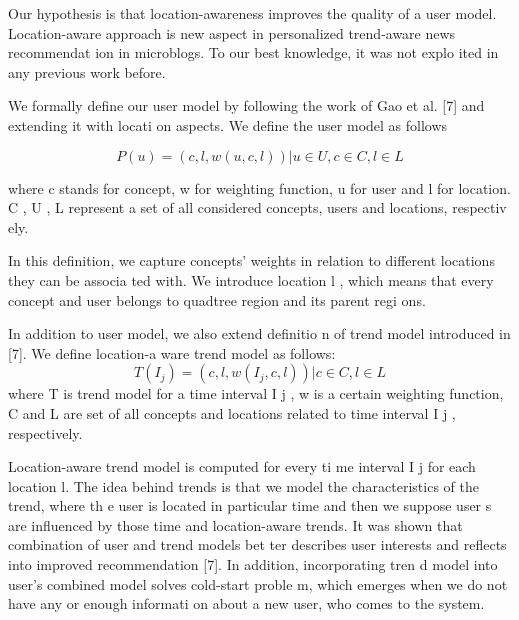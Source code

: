 \documentclass[conference]{IEEEtran}
\begin{document}
Our  hypothesis  is  that  location-awareness  improves 
the 
quality  of  a  user  model.  Location-aware  approach  is
  new 
aspect  in  personalized  trend-aware  news  recommendat
ion  in 
microblogs.  To  our  best  knowledge,  it  was  not  explo
ited  in 
any previous work before. 

We  formally  define  our  user  model  by  following  the 
work of Gao et al. [7] and extending it with locati
on aspects. 
We define the user model as follows

\begin{equation}
P(u) = {(c,l,w(u,c,l))|u∈U,c∈C,l∈L}
\label{id1}
\end{equation}

where 
c
  stands  for  concept, 
w
  for  weighting  function, 
u
  for 
user  and 
l
  for  location. 
C
, 
U
, 
L
  represent  a  set  of  all 
considered concepts, users and locations, respectiv
ely. 

In   this   definition,   we   capture   concepts’   weights   in
relation  to  different  locations  they  can  be  associa
ted  with. 
We introduce location 
l
, which means that every concept and 
user belongs to quadtree region and its parent regi
ons. 

In  addition  to  user  model,  we  also  extend  definitio
n  of 
trend  model  introduced  in  [7].  We  define  location-a
ware 
trend model as follows: 
\begin{equation}
T(I_j)={(c,l,w(I_j,c,l))|c∈C,l∈L}
\label{id2}
\end{equation}
where 
T
  is  trend  model  for  a  time  interval 
I
j
, 
w
  is  a  certain 
weighting  function, 
C
  and 
L
  are  set  of  all  concepts  and 
locations related to time interval 
I
j
, respectively. 

Location-aware  trend  model  is  computed  for  every  ti
me 
interval 
I
j
 for  each  location 
l. 
The  idea  behind  trends  is  that 
we  model  the  characteristics  of  the  trend,  where  th
e  user  is 
located  in  particular  time  and  then  we  suppose  user
s  are 
influenced  by  those  time  and  location-aware  trends.
  It  was 
shown  that  combination  of  user  and  trend  models  bet
ter 
describes    user    interests    and    reflects    into    improved
recommendation  [7].  In  addition,  incorporating  tren
d  model 
into user’s combined model solves cold-start proble
m, which 
emerges  when  we  do  not  have  any  or  enough  informati
on 
about a new user, who comes to the system.  
\end{document}
